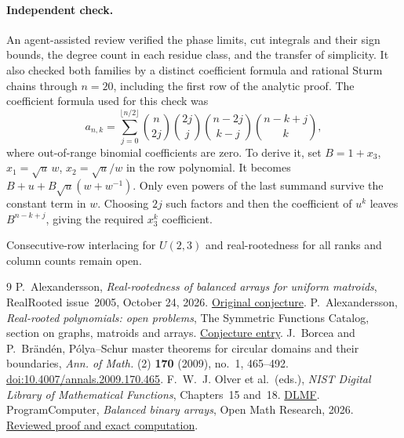 \documentclass[11pt]{article}
\begin{document}
\paragraph{Independent check.}
An agent-assisted review verified the phase limits, cut integrals and their sign bounds, the degree count in each residue class, and the transfer of simplicity. It also checked both families by a distinct coefficient formula and rational Sturm chains through \(n=20\), including the first row of the analytic proof. The coefficient formula used for this check was
\[
a_{n,k}=\sum_{j=0}^{\lfloor n/2\rfloor}
   \binom n{2j}\binom{2j}{j}\binom{n-2j}{k-j}\binom{n-k+j}{k},
\]
where out-of-range binomial coefficients are zero. To derive it, set \(B=1+x_3\), \(x_1=\sqrt{u}\,w\), \(x_2=\sqrt{u}/w\) in the row polynomial. It becomes \(B+u+B\sqrt{u}(w+w^{-1})\). Only even powers of the last summand survive the constant term in \(w\). Choosing \(2j\) such factors and then the coefficient of \(u^k\) leaves \(B^{n-k+j}\), giving the required \(x_3^k\) coefficient.

Consecutive-row interlacing for \(U(2,3)\) and real-rootedness for all ranks and column counts remain open.

\begin{thebibliography}{9}
 P.~Alexandersson, \emph{Real-rootedness of balanced arrays for uniform matroids}, RealRooted issue~2005, October 24, 2026. \href{https://github.com/PerAlexandersson/RealRooted/issues/2005}{Original conjecture}.
 P.~Alexandersson, \emph{Real-rooted polynomials: open problems}, The Symmetric Functions Catalog, section on graphs, matroids and arrays. \href{https://www.symmetricfunctions.com/realRootedOpenProblems.htm\#openProblemsGraphs}{Conjecture entry}.
 J.~Borcea and P.~Br\"and\'en, P\'olya--Schur master theorems for circular domains and their boundaries, \emph{Ann. of Math.} (2) \textbf{170} (2009), no.~1, 465--492. \href{https://doi.org/10.4007/annals.2009.170.465}{doi:10.4007/annals.2009.170.465}.
 F.~W.~J. Olver et al.\ (eds.), \emph{NIST Digital Library of Mathematical Functions}, Chapters~15 and~18. \href{https://dlmf.nist.gov/}{DLMF}.
 ProgramComputer, \emph{Balanced binary arrays}, Open Math Research, 2026. \href{https://github.com/ProgramComputer/open-math-research/pull/8/files}{Reviewed proof and exact computation}.
\end{thebibliography}
\end{document}
